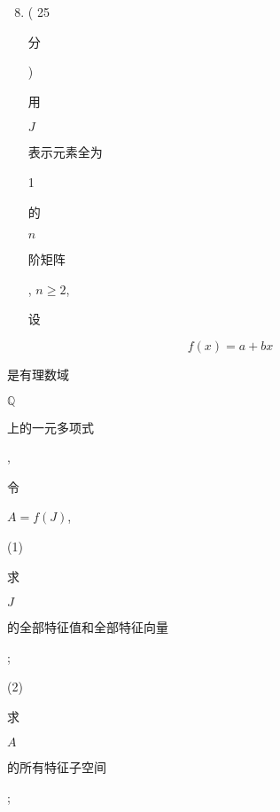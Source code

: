 \documentclass[10pt]{article}
\begin{document}
\begin{enumerate}
  \setcounter{enumi}{7}
  \item ( 25 \begin{CJK}{UTF8}{mj}分\end{CJK}) \begin{CJK}{UTF8}{mj}用\end{CJK} $J$ \begin{CJK}{UTF8}{mj}表示元素全为\end{CJK} 1 \begin{CJK}{UTF8}{mj}的\end{CJK} $n$ \begin{CJK}{UTF8}{mj}阶矩阵\end{CJK}, $n \geq 2$, \begin{CJK}{UTF8}{mj}设\end{CJK}
\end{enumerate}
$$
f(x)=a+b x
$$
\begin{CJK}{UTF8}{mj}是有理数域\end{CJK} $\mathbb{Q}$ \begin{CJK}{UTF8}{mj}上的一元多项式\end{CJK}, \begin{CJK}{UTF8}{mj}令\end{CJK} $A=f(J)$,

(1) \begin{CJK}{UTF8}{mj}求\end{CJK} $J$ \begin{CJK}{UTF8}{mj}的全部特征值和全部特征向量\end{CJK};

(2) \begin{CJK}{UTF8}{mj}求\end{CJK} $A$ \begin{CJK}{UTF8}{mj}的所有特征子空间\end{CJK};
\end{document}
